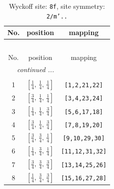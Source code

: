 \documentclass[fleqn,8pt]{jsarticle}
\begin{document}
\begin{longtable}{ccc}
\caption{Wyckoff site: {\tt 8f}, site symmetry: {\tt 2/m'..}}
 \\
 \hline \hline
No. & position & mapping \\ \hline \endfirsthead

\multicolumn{2}{l}{\tablename\ \thetable{}} \\
 \hline \hline
No. & position & mapping \\ \hline \endhead

 \hline \hline
\multicolumn{2}{r}{\footnotesize\it continued ...} \\ \endfoot

 \hline \hline
\multicolumn{2}{r}{} \\ \endlastfoot

1 & $\left[ \frac{1}{4},\, \frac{1}{4},\, \frac{1}{4} \right]$ & {\tt [1,2,21,22]} \\ \hline
2 & $\left[ \frac{3}{4},\, \frac{1}{4},\, \frac{1}{4} \right]$ & {\tt [3,4,23,24]} \\ \hline
3 & $\left[ \frac{1}{4},\, \frac{1}{4},\, \frac{3}{4} \right]$ & {\tt [5,6,17,18]} \\ \hline
4 & $\left[ \frac{3}{4},\, \frac{1}{4},\, \frac{3}{4} \right]$ & {\tt [7,8,19,20]} \\ \hline
5 & $\left[ \frac{3}{4},\, \frac{3}{4},\, \frac{1}{4} \right]$ & {\tt [9,10,29,30]} \\ \hline
6 & $\left[ \frac{1}{4},\, \frac{3}{4},\, \frac{1}{4} \right]$ & {\tt [11,12,31,32]} \\ \hline
7 & $\left[ \frac{3}{4},\, \frac{3}{4},\, \frac{3}{4} \right]$ & {\tt [13,14,25,26]} \\ \hline
8 & $\left[ \frac{1}{4},\, \frac{3}{4},\, \frac{3}{4} \right]$ & {\tt [15,16,27,28]} \\
\end{longtable}
\renewcommand{\arraystretch}{1.2}
\end{document}
